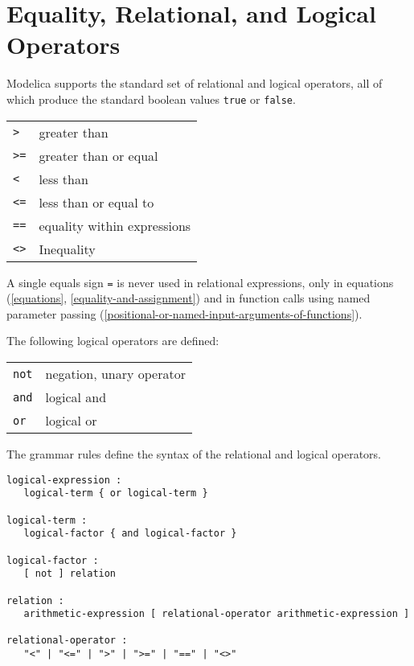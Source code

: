 \section{Equality, Relational, and Logical Operators}\label{equality-relational-and-logical-operators}

Modelica supports the standard set of relational and logical operators,
all of which produce the standard boolean values \lstinline!true! or \lstinline!false!.


\begin{longtable}[]{ll}
\lstinline!>! & greater than\\
\lstinline!>=! & greater than or equal\\
\lstinline!<! & less than\\
\lstinline!<=! & less than or equal to\\
\lstinline!==! & equality within expressions\\
\lstinline!<>! & Inequality\\
\end{longtable}

A single equals sign \lstinline!=! is never used in relational expressions, only in
equations (\cref{equations}, \cref{equality-and-assignment}) and in function calls using named
parameter passing (\cref{positional-or-named-input-arguments-of-functions}).

The following logical operators are defined:
\begin{longtable}[]{ll}
\lstinline!not! & negation, unary operator\\
\lstinline!and! & logical and\\
\lstinline!or! & logical or\\
\end{longtable}

The grammar rules define the syntax of the relational and logical
operators.

\begin{lstlisting}[language=grammar]
logical-expression :
   logical-term { or logical-term }

logical-term :
   logical-factor { and logical-factor }

logical-factor :
   [ not ] relation

relation :
   arithmetic-expression [ relational-operator arithmetic-expression ]

relational-operator :
   "<" | "<=" | ">" | ">=" | "==" | "<>"
\end{lstlisting}

